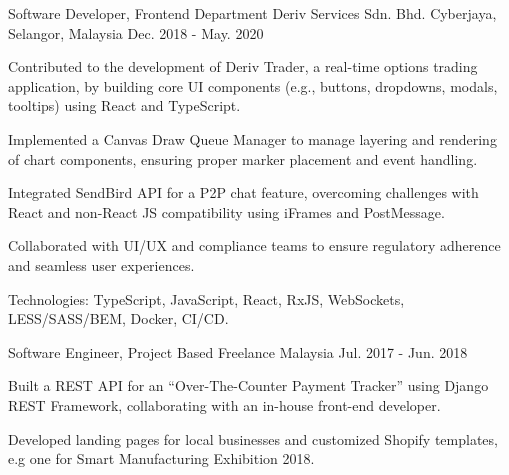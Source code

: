 \begin{cventries}
  \cventry
    {Software Developer, Frontend Department} %
    {Deriv Services Sdn. Bhd.} %
    {Cyberjaya, Selangor, Malaysia} %
    {Dec. 2018 - May. 2020} %
    {
      \begin{cvitems} %
        \item {Contributed to the development of Deriv Trader, a real-time options trading application, by building core UI components (e.g., buttons, dropdowns, modals, tooltips) using React and TypeScript.}
        \item {Implemented a Canvas Draw Queue Manager to manage layering and rendering of chart components, ensuring proper marker placement and event handling.}
        \item {Integrated SendBird API for a P2P chat feature, overcoming challenges with React and non-React JS compatibility using iFrames and PostMessage.}
        \item {Collaborated with UI/UX and compliance teams to ensure regulatory adherence and seamless user experiences.}
        \item {Technologies: TypeScript, JavaScript, React, RxJS, WebSockets, LESS/SASS/BEM, Docker, CI/CD.}
      \end{cvitems}
    }

  \cventry
    {Software Engineer, Project Based} %
    {Freelance} %
    {Malaysia} %
    {Jul. 2017 - Jun. 2018} %
    {
      \begin{cvitems} %
        \item {Built a REST API for an “Over-The-Counter Payment Tracker” using Django REST Framework, collaborating with an in-house front-end developer.}
        \item {Developed landing pages for local businesses and customized Shopify templates, e.g one for Smart Manufacturing Exhibition 2018.}
      \end{cvitems}
    }

\end{cventries}
